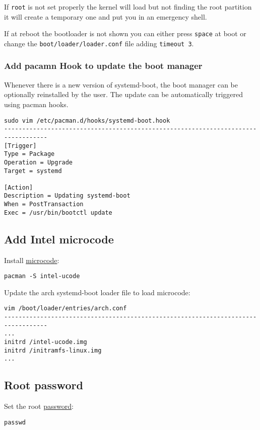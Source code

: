 \documentclass[12pt,A4]{article}
\begin{document}
\begin{tcolorbox}[boxrule=0.2mm]
If \texttt{root} is not set properly the kernel will load but not finding the root partition it will create a temporary one and put you in an emergency shell.
\end{tcolorbox}
If at reboot the bootloader is not shown you can either press \texttt{space} at boot or change the \texttt{boot/loader/loader.conf} file adding \texttt{timeout 3}.

\subsubsection{Add pacamn Hook to update the boot manager}
Whenever there is a new version of systemd-boot, the boot manager can be optionally reinstalled by the user. The update can be automatically triggered using pacman hooks.\newline
\begin{verbatim}
sudo vim /etc/pacman.d/hooks/systemd-boot.hook
----------------------------------------------------------------------------------
[Trigger]
Type = Package
Operation = Upgrade
Target = systemd

[Action]
Description = Updating systemd-boot
When = PostTransaction
Exec = /usr/bin/bootctl update
\end{verbatim}
\subsection{Add Intel microcode}
Install \href{https://wiki.archlinux.org/index.php/Microcode}{microcode}:
\begin{verbatim}
pacman -S intel-ucode
\end{verbatim}
Update the arch systemd-boot loader file to load microcode:
\begin{verbatim}
vim /boot/loader/entries/arch.conf
----------------------------------------------------------------------------------
...
initrd /intel-ucode.img
initrd /initramfs-linux.img
...
\end{verbatim}

\subsection{Root password} 
Set the root \href{https://wiki.archlinux.org/index.php/Password}{password}:
\begin{verbatim}
passwd
\end{verbatim}
\end{document}
